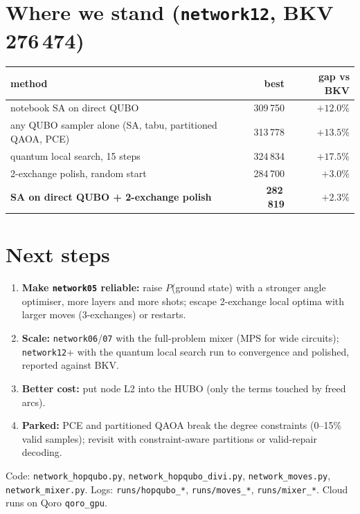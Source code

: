 \documentclass[11pt]{article}
\begin{document}
\section{Where we stand (\texttt{network12}, BKV 276\,474)}
\begin{center}
\begin{tabular}{@{}lrr@{}}
\toprule
method & best & gap vs BKV\\
\midrule
notebook SA on direct QUBO & 309\,750 & $+12.0\%$\\
any QUBO sampler alone (SA, tabu, partitioned QAOA, PCE) & 313\,778 & $+13.5\%$\\
quantum local search, 15 steps & 324\,834 & $+17.5\%$\\
2-exchange polish, random start & 284\,700 & $+3.0\%$\\
\textbf{SA on direct QUBO + 2-exchange polish} & \textbf{282\,819} & $\mathbf{+2.3\%}$\\
\bottomrule
\end{tabular}
\end{center}

\section{Next steps}
\begin{enumerate}
\item \textbf{Make \texttt{network05} reliable:} raise $P$(ground state) with a stronger
  angle optimiser, more layers and more shots; escape 2-exchange local optima with larger
  moves (3-exchanges) or restarts.
\item \textbf{Scale:} \texttt{network06}/\texttt{07} with the full-problem mixer (MPS for
  wide circuits); \texttt{network12}+ with the quantum local search run to convergence
  and polished, reported against BKV.
\item \textbf{Better cost:} put node L2 into the HUBO (only the terms touched by freed arcs).
\item \textbf{Parked:} PCE and partitioned QAOA break the degree constraints (0--15\% valid
  samples); revisit with constraint-aware partitions or valid-repair decoding.
\end{enumerate}

\vfill
\noindent\footnotesize Code: \texttt{network\_hopqubo.py}, \texttt{network\_hopqubo\_divi.py},
\texttt{network\_moves.py}, \texttt{network\_mixer.py}. Logs: \texttt{runs/hopqubo\_*},
\texttt{runs/moves\_*}, \texttt{runs/mixer\_*}. Cloud runs on Qoro \texttt{qoro\_gpu}.
\end{document}
